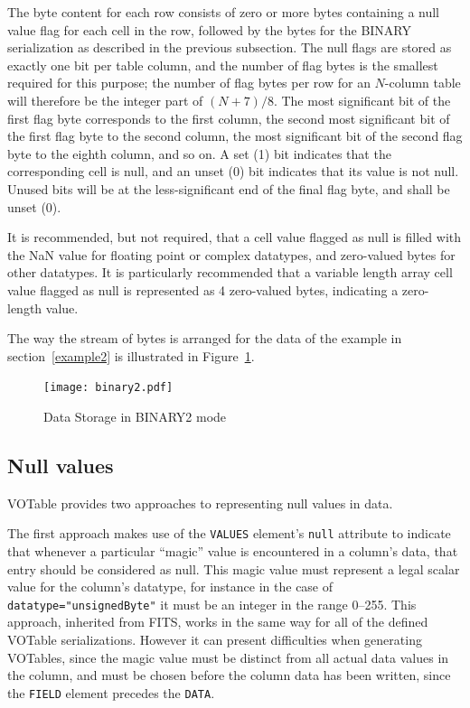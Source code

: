 \documentclass[11pt,a4paper]{ivoa}
\def\Aref#1{section~\ref{#1}}
\def\Fref#1{Figure~\ref{#1}}
\let\fg=\color
\def\attr#1{{\tt{\fg{DarkRed}#1}}}
\def\elem#1{{\tt{\fg{DarkRed}#1}}}
\def\attrval#1#2{{\tt{\fg{DarkRed}#1}="{\fg{DarkPurple}#2}"}}
\begin{document}
{The byte content for each row consists of
zero or more bytes containing a null value flag for each cell in the row,
followed by the bytes for the BINARY serialization as described in the
previous subsection.
The null flags are stored as exactly one bit per table column, and the number
of flag bytes is the smallest required for this purpose;
the number of flag bytes per row for an $N$-column table will therefore
be the integer part of  $(N+7)/8$.
The most significant bit of the first flag byte corresponds to the
first column,
the second most significant bit of the first flag byte to the second column,
the most significant bit of the second flag byte to the eighth column,
and so on.  A set (1) bit indicates that the corresponding cell is null,
and an unset (0) bit indicates that its value is not null.
Unused bits will be at the less-significant end of the final flag byte,
and shall be unset (0).

It is recommended, but not required, that a cell value flagged as null
is filled with the NaN value for floating point or complex datatypes,
and zero-valued bytes for other datatypes.
It is particularly recommended that a variable length array cell value
flagged as null is represented as 4 zero-valued bytes, indicating
a zero-length value.

The way the stream of bytes is arranged for the data of the
example in \Aref{example2} is illustrated in
\Fref{fig:bin2}.

\label{Image3}
\begin{center}
\begin{figure}[htb]
\texttt{[image: binary2.pdf]}
\caption{\label{fig:bin2}Data Storage in BINARY2 mode}
\end{figure}\end{center}

\subsection{Null values}
\label{sec:NULL}

VOTable provides two approaches to representing null values in data.

The first approach makes use of the \elem{VALUES} element's \attr{null}
attribute to indicate that whenever a particular ``magic'' value is
encountered in a column's data, that entry should be considered as null.
This magic value must represent a legal scalar value for the column's
datatype, for instance in the case of {\attrval{datatype}{unsignedByte}}
it must be an integer in the range 0--255.
This approach, inherited from FITS, works in the same way for all
of the defined VOTable serializations.
However it can present difficulties when generating VOTables,
since the magic value must be distinct from all actual data values
in the column, and must be chosen before the column data has
been written, since the \elem{FIELD} element precedes the \elem{DATA}.

}
\end{document}
